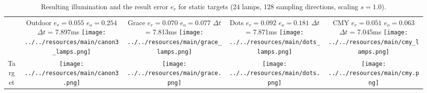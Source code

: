 \begin{table}[H]
\caption[Results (static scenes)]{\label{tab:main}Resulting illumination and the result error $e_r$ for static targets (24 lamps, 128 sampling directions, scaling $s=1.0$). }
\begin{tabular}{ccccc}
  &
  \shortstack{ Outdoor \\ $e_r=0.055$ \\ $e_o=0.254$ \\ $\Delta t$ = 7.897ms \\ \vspace{0.2cm} \\
    \texttt{[image: ../../resources/main/canon3\_lamps.png]} }
   &
  \shortstack{ Grace \\ $e_r=0.070$ \\ $e_o=0.077$ \\ $\Delta t$ = 7.813ms \\ \vspace{0.2cm} \\
    \texttt{[image: ../../resources/main/grace\_lamps.png]}}
   &
  \shortstack{ Dots \\ $e_r=0.092$ \\ $e_o=0.181$ \\ $\Delta t$ = 7.871ms \\ \vspace{0.2cm} \\
    \texttt{[image: ../../resources/main/dots\_lamps.png]} }
   &
  \shortstack{ CMY \\ $e_r=0.051$ \\ $e_o=0.063$ \\ $\Delta t$ = 7.045ms \\ \vspace{0.2cm} \\
    \texttt{[image: ../../resources/main/cmy\_lamps.png]} } \\
  
  \shortstack{ Target \\ \vspace{0.9cm} } &
  \texttt{[image: ../../resources/main/canon3.png]} &
  \texttt{[image: ../../resources/main/grace.png]} &
  \texttt{[image: ../../resources/main/dots.png]} &
  \texttt{[image: ../../resources/main/cmy.png]} \\
 

\end{tabular}
\end{table}

